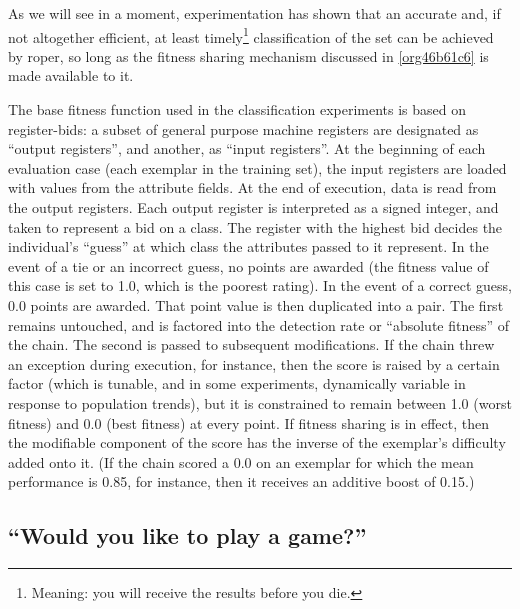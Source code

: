 \documentclass[12pt,glossary]{dalthesis}
\begin{document}
As we will see in a moment, experimentation has shown that an accurate and, if not
altogether efficient, at least timely\footnote{Meaning: you will receive the results before you die.} classification of the set can be achieved by
\gls{roper}, so long as the fitness sharing mechanism discussed in \ref{org46b61c6}
is made available to it. 

The base fitness function used in the classification experiments is based on
register-bids: a subset of general purpose machine registers are designated
as ``output registers'', and another, as ``input registers''. At the beginning of
each evaluation case (each exemplar in the training set), the input registers
are loaded with values from the attribute fields. At the end of execution,
data is read from the output registers. Each output register is interpreted
as a signed integer, and taken to represent a bid on a class. The register
with the highest bid decides the individual's ``guess'' at which class the
attributes passed to it represent. In the event of a tie or an incorrect
guess, no points are awarded (the fitness value of this case is set to 1.0,
which is the poorest rating). In the event of a correct guess, 0.0 points
are awarded. That point value is then duplicated into a pair. The first
remains untouched, and is factored into the detection rate or ``absolute
fitness'' of the chain. The second is passed to subsequent modifications.
If the chain threw an exception during execution, for instance, then the
score is raised by a certain factor (which is tunable, and in some experiments,
dynamically variable in response to population trends), but it is constrained
to remain between 1.0 (worst fitness) and 0.0 (best fitness) at every point.
If fitness sharing is in effect, then the modifiable component of the score
has the inverse of the exemplar's difficulty added onto it. (If the chain
scored a 0.0 on an exemplar for which the mean performance is 0.85, for instance,
then it receives an additive boost of 0.15.)



\subsection{``Would you like to play a game?''}
\label{sec:org943b638}
\label{org6ffdad6}
\end{document}
